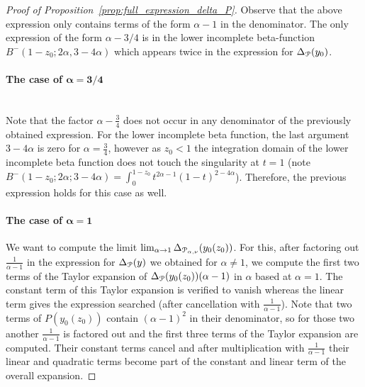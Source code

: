 \begin{proof}[Proof of Proposition~\ref{prop:full_expression_delta_P}]
Observe that the above expression only contains terms of the form $\alpha - 1$ in the denominator. The only expression of the form $\alpha - 3/4$ is in the lower incomplete beta-function $B^-(1 - z_0; 2 \alpha, 3 - 4 \alpha)$ which appears twice in the expression for $\Delta_{{\mathcal P}}(y_0)$. 

\paragraph{The case of $\bm{\alpha = 3/4}$}\hfil\\

Note that the factor $\alpha-\frac{3}{4}$ does not occur in any denominator of the previously obtained expression. For the lower incomplete beta function, the last argument $3-4\alpha$ is zero for $\alpha=\frac{3}{4}$, however as $z_0 < 1$ the integration domain of the lower incomplete beta function does not touch the singularity at $t=1$ (note $B^-(1-z_0;2\alpha;3-4\alpha) = \int_0^{1-z_0} t^{2\alpha-1} (1-t)^{2-4\alpha}$). Therefore, the previous expression holds for this case as well.


\paragraph{The case of $\bm{\alpha = 1}$}

We want to compute the limit $\lim_{\alpha \rightarrow 1} \Delta_{{\mathcal P}_{\alpha,\nu}}(y_0(z_0))$. For this, after factoring out $\frac{1}{\alpha-1}$ in the expression for $\Delta_{{\mathcal P}}(y)$ we obtained for $\alpha \ne 1$, we compute the first two terms of the Taylor expansion of $\Delta_{{\mathcal P}}(y_0(z_0))(\alpha-1)$ in $\alpha$ based at $\alpha = 1$. The constant term of this Taylor expansion is verified to vanish whereas the linear term gives the expression searched (after cancellation with $\frac{1}{\alpha-1}$). Note that two terms of $P(y_0(z_0))$ contain $(\alpha-1)^2$ in their denominator, so for those two another $\frac{1}{\alpha-1}$ is factored out and the first three terms of the Taylor expansion are computed. Their constant terms cancel and after multiplication with $\frac{1}{\alpha-1}$ their linear and quadratic terms become part of the constant and linear term of the overall expansion.


\end{proof}
